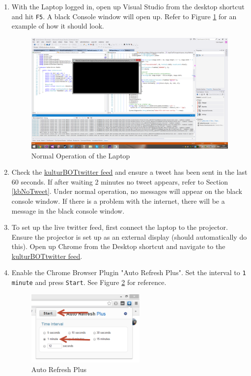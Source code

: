 \documentclass[]{article}
\newcommand{\kb}{kulturBOT}
\newcommand{\kbspace}{\kb \space}
\begin{document}
\begin{enumerate}
	\item With the Laptop logged in, open up Visual Studio from the desktop shortcut and hit \texttt{F5}. A black Console window will open up. Refer to Figure \ref{normalVS} for an example of how it should look.
	
	\begin{figure}[h!]
		\centering
	    \includegraphics[width=1\textwidth]{img/normalVSlook.png}
	    \caption{Normal Operation of the Laptop}
	    \label{normalVS}
	\end{figure}
	
	\item Check the \href{https://twitter.com/kulturBOT}{\kbspace twitter feed} and ensure a tweet has been sent in the last 60 seconds. If after waiting 2 minutes no tweet appears, refer to Section \ref{kbNoTweet}. Under normal operation, no messages will appear on the black console window. If there is a problem with the internet, there will be a message in the black console window.
	
	\item To set up the live twitter feed, first connect the laptop to the projector. Ensure the projector is set up as an external display (should automatically do this). Open up Chrome from the Desktop shortcut and navigate to the \href{https://twitter.com/kulturBOT}{\kbspace twitter feed}.
	
	\item Enable the Chrome Browser Plugin "Auto Refresh Plus". Set the interval to \texttt{1 minute} and press \texttt{Start}. See Figure \ref{autorefresh} for reference.
	
	\begin{figure}[h!]
			\centering
		    \includegraphics[width=0.55\textwidth]{img/autorefresh.png}
		    \caption{Auto Refresh Plus}
		    \label{autorefresh}
		\end{figure}
		

\end{enumerate}
\end{document}

